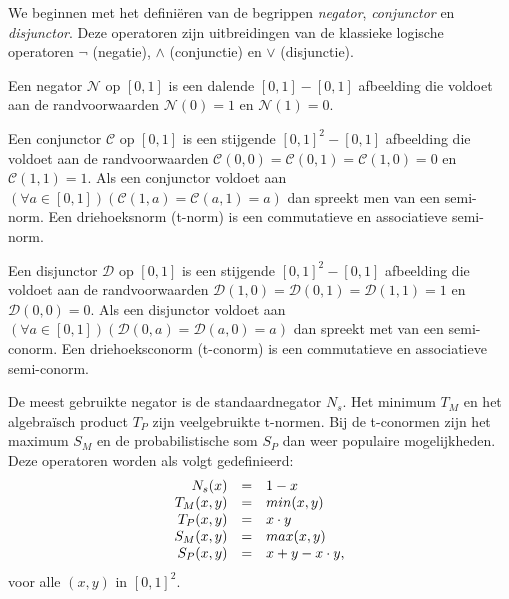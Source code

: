We beginnen met het defini\"eren van de begrippen \emph{negator}, \emph{conjunctor} en 
\emph{disjunctor}. Deze operatoren zijn uitbreidingen van de klassieke logische operatoren
$\lnot$ (negatie), $\land$ (conjunctie) en $\lor$ (disjunctie).
\begin{definitie}
Een negator $\mathcal{N}$ op $[0,1]$ is een dalende $[0,1] - [0,1]$ afbeelding die voldoet
aan de randvoorwaarden $\mathcal{N}(0)=1$ en $\mathcal{N}(1)=0$. 
\end{definitie}
\begin{definitie}
Een conjunctor $\mathcal{C}$ op $[0,1]$ is een stijgende $[0,1]^2 - [0,1]$ afbeelding die voldoet aan de
randvoorwaarden $\mathcal{C}(0,0)=\mathcal{C}(0,1)=\mathcal{C}(1,0)=0$ en $\mathcal{C}(1,1)=1$. 
Als een conjunctor voldoet aan 
$(\forall a \in [0,1])(\mathcal{C}(1,a)=\mathcal{C}(a,1)=a)$ dan spreekt men van een semi-norm.
Een driehoeksnorm (t-norm) is een commutatieve en associatieve semi-norm.
\end{definitie}
\begin{definitie}
Een disjunctor $\mathcal{D}$ op $[0,1]$ is een stijgende $[0,1]^2 - [0,1]$ afbeelding die voldoet
aan de randvoorwaarden $\mathcal{D}(1,0)=\mathcal{D}(0,1)=\mathcal{D}(1,1)=1$ en 
$\mathcal{D}(0,0)=0$. Als een disjunctor voldoet aan 
$(\forall a \in [0,1])(\mathcal{D}(0,a)=\mathcal{D}(a,0)=a)$ dan spreekt met van een semi-conorm.
Een driehoeksconorm (t-conorm) is een commutatieve en associatieve semi-conorm.
\end{definitie}

De meest gebruikte negator is de standaardnegator $N_s$. Het minimum $T_M$ en het algebra\"isch 
product $T_P$ zijn veelgebruikte t-normen. Bij de t-conormen zijn het maximum $S_M$ en de
probabilistische som $S_P$ dan weer populaire mogelijkheden. Deze operatoren worden als 
volgt gedefinieerd:
$$
\begin{array}{r@{\quad=\quad}l}
N_s(x) & 1 - x \\
T_M(x,y) & min(x,y) \\
T_P(x,y) & x \cdot y \\
S_M(x,y) & max(x,y) \\
S_P(x,y) & x +y - x \cdot y,
\end{array}
$$
voor alle $(x,y)$ in $[0,1]^2$.

